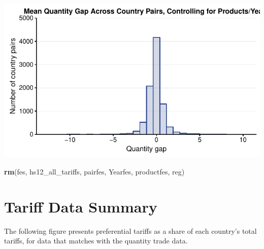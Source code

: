 \documentclass[10pt,]{article}
\newenvironment{Shaded}{\begin{snugshade}}{\end{snugshade}}
\newcommand{\KeywordTok}[1]{\textcolor[rgb]{0.13,0.29,0.53}{\textbf{{#1}}}}
\newcommand{\NormalTok}[1]{{#1}}
\begin{document}
\begin{center}\includegraphics{Figs/qty_summary-12} \end{center}

\begin{Shaded}
\begin{Highlighting}[]
\KeywordTok{rm}\NormalTok{(fes, hs12_all_tariffs, pairfes, Yearfes, productfes, reg)}
\end{Highlighting}
\end{Shaded}

\section{Tariff Data Summary}\label{tariff-data-summary}

The following figure presents preferential tariffs as a share of each
country's total tariffs, for data that matches with the quantity trade
data.
\end{document}
